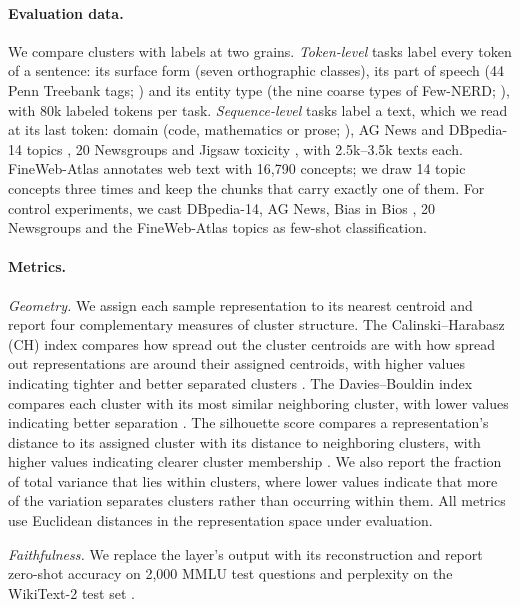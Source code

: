 \documentclass[11pt]{article}
\begin{document}
\paragraph{Evaluation data.}
We compare clusters with labels at two grains.
\emph{Token-level} tasks label every token of a sentence: its surface form (seven orthographic classes), its part of speech (44 Penn Treebank tags; \citealp{marcus1993penntreebank}) and its entity type (the nine coarse types of Few-NERD; \citealp{ding2021fewnerd}), with 80k labeled tokens per task.
\emph{Sequence-level} tasks label a text, which we read at its last token: domain (code, mathematics or prose; \citealp{husain2019codesearchnet,zhang2024stackmathqa,wikimedia2023wikipedia}), AG News and DBpedia-14 topics \citep{zhang2015datasets}, 20 Newsgroups \citep{rennie2008newsgroups} and Jigsaw toxicity \citep{jigsaw2018toxicity}, with 2.5k--3.5k texts each.
FineWeb-Atlas \citep{monson2026finewebatlas} annotates web text with 16{,}790 concepts; we draw 14 topic concepts three times and keep the chunks that carry exactly one of them. For control experiments, we cast DBpedia-14, AG News, Bias in Bios \citep[27 professions;][]{dearteaga2019biasbios}, 20 Newsgroups and the FineWeb-Atlas topics as few-shot classification.

\paragraph{Metrics.}
\emph{Geometry.} We assign each sample representation to its nearest centroid and report four complementary measures of cluster structure. The Calinski--Harabasz (CH) index compares how spread out the cluster centroids are with how spread out representations are around their assigned centroids, with higher values indicating tighter and better separated clusters \citep{calinski1974dendrite}. The Davies--Bouldin index compares each cluster with its most similar neighboring cluster, with lower values indicating better separation \citep{davies1979cluster}. The silhouette score compares a representation's distance to its assigned cluster with its distance to neighboring clusters, with higher values indicating clearer cluster membership \citep{rousseeuw1987silhouettes}. We also report the fraction of total variance that lies within clusters, where lower values indicate that more of the variation separates clusters rather than occurring within them. All metrics use Euclidean distances in the representation space under evaluation.

\emph{Faithfulness.} We replace the layer's output with its reconstruction and report zero-shot accuracy on 2{,}000 MMLU test questions \citep{hendrycks2021measuring} and perplexity on the WikiText-2 test set \citep{merity2017pointer}.
\end{document}
